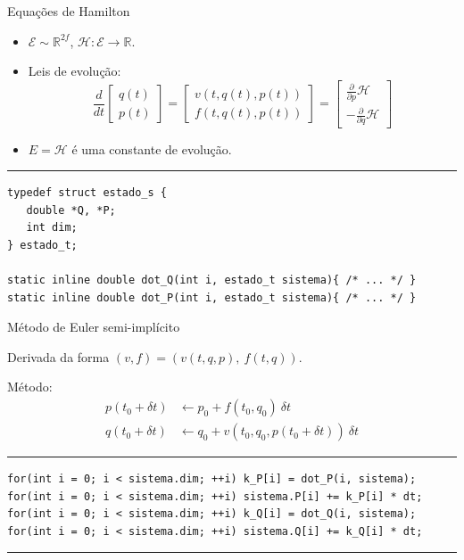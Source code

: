 \documentclass{beamer}
\begin{document}
\begin{frame}[fragile]{Equações de Hamilton}
   \begin{itemize}
      \item $\mathcal E \sim \mathbb R^{2f}$,
      $\mathcal H:\mathcal E\rightarrow\mathbb R$.
      \item Leis de evolução:
      \begin{equation}
         \frac{d}{dt}
         \begin{bmatrix} q(t) \\ p(t) \end{bmatrix} =
         \begin{bmatrix} v(t, q(t), p(t)) \\ f(t, q(t), p(t)) \end{bmatrix} =
         \begin{bmatrix}
            \frac{\partial}{\partial p}\mathcal H\\
            -\frac{\partial}{\partial q}\mathcal H
         \end{bmatrix}
      \end{equation}
      \item $E = \mathcal H$ é uma constante de evolução.
   \end{itemize}


   \rule{\textwidth}{1pt}
   \scriptsize
\begin{lstlisting}[style = c]
typedef struct estado_s {
   double *Q, *P;
   int dim;
} estado_t;

static inline double dot_Q(int i, estado_t sistema){ /* ... */ }
static inline double dot_P(int i, estado_t sistema){ /* ... */ }
\end{lstlisting}
\end{frame}

\begin{frame}[fragile]{Método de Euler semi-implícito}

   {\scriptsize Derivada da forma $(v, f) = (v(t, q, p), ~ f(t, q))$.}

   Método:
   \begin{align}
      p(t_0 + \delta t) &\leftarrow p_0 + f(t_0, q_0) ~ \delta t \\
      q(t_0 + \delta t) &\leftarrow q_0 + v(t_0, q_0, p(t_0 + \delta t)) ~ \delta t
   \end{align}

   \rule{\textwidth}{1pt}
   \scriptsize
\begin{lstlisting}[style = c]
for(int i = 0; i < sistema.dim; ++i) k_P[i] = dot_P(i, sistema);
for(int i = 0; i < sistema.dim; ++i) sistema.P[i] += k_P[i] * dt;
for(int i = 0; i < sistema.dim; ++i) k_Q[i] = dot_Q(i, sistema);
for(int i = 0; i < sistema.dim; ++i) sistema.Q[i] += k_Q[i] * dt;
\end{lstlisting}
   \rule{\textwidth}{1pt}
\end{frame}
\end{document}
